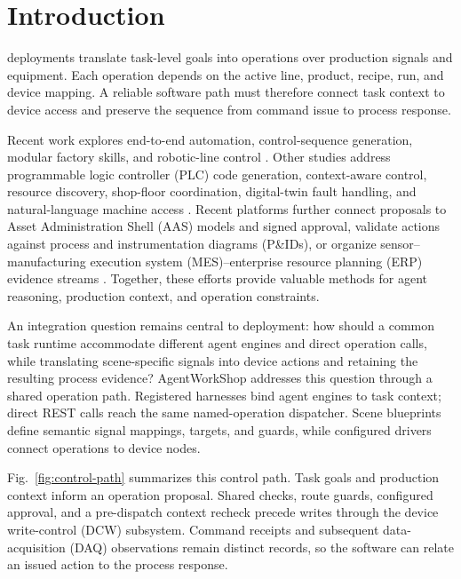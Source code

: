 \section{Introduction}
 deployments translate task-level goals into
operations over production signals and equipment. Each operation depends on
the active line, product, recipe, run, and device mapping. A reliable software
path must therefore connect task context to device access and preserve the
sequence from command issue to process response.

Recent work explores end-to-end automation, control-sequence generation,
modular factory skills, and robotic-line control
\cite{xia2025control,huang2026made,koehle2026llmdriven,waseem2026pretrained}.
Other studies address programmable logic controller (PLC) code generation,
context-aware control, resource discovery, shop-floor coordination,
digital-twin fault handling, and natural-language machine access
\cite{liu2026agents4plc,wu2025instructmpc,lim2025llmenabled,zhao2026shopfloor,gill2025llmdt,hofmann2025nlc}.
Recent platforms further connect proposals to Asset Administration Shell
(AAS) models and signed approval, validate actions against process and
instrumentation diagrams (P\&IDs), or organize sensor--manufacturing
execution system (MES)--enterprise resource planning (ERP) evidence streams
\cite{graul2026aas,schall2026safe,lin2026agentic}. Together, these efforts
provide valuable methods for agent reasoning, production context, and
operation constraints.

An integration question remains central to deployment: how should a common
task runtime accommodate different agent engines and direct operation calls,
while translating scene-specific signals into device actions and retaining
the resulting process evidence? AgentWorkShop addresses this question through
a shared operation path. Registered harnesses bind agent engines to task
context; direct REST calls reach the same named-operation dispatcher. Scene
blueprints define semantic signal mappings, targets, and guards, while
configured drivers connect operations to device nodes.

Fig.~\ref{fig:control-path} summarizes this control path. Task goals and
production context inform an operation proposal. Shared checks, route guards,
configured approval, and a pre-dispatch context recheck precede writes through
the device write-control (DCW) subsystem. Command receipts and subsequent
data-acquisition (DAQ) observations remain distinct records, so the software
can relate an issued action to the process response.

